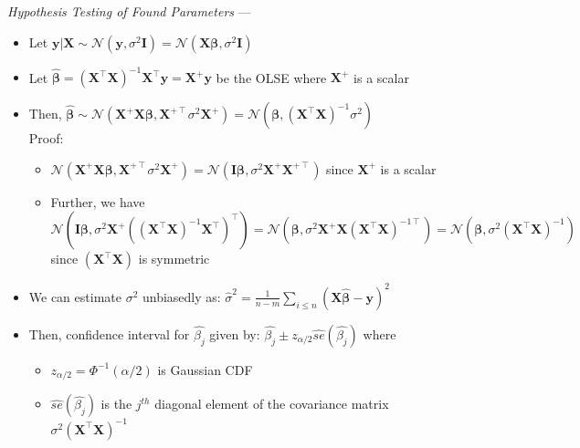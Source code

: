 \emph{Hypothesis Testing of Found Parameters} --- 
\begin{itemize}
    \item Let $\boldsymbol{y} | \boldsymbol{X} \sim \mathcal{N} (\boldsymbol{y}, \sigma^2 \boldsymbol{I}) = \mathcal{N} (\boldsymbol{X} \boldsymbol{\beta}, \sigma^2 \boldsymbol{I})$
    \item Let $\boldsymbol{\hat{\beta}} = (\boldsymbol{X}^\intercal \boldsymbol{X})^{-1}  \boldsymbol{X}^\intercal \boldsymbol{y} = \boldsymbol{X}^+ \boldsymbol{y}$ be the OLSE where $\boldsymbol{X}^+$ is a scalar
    \item Then, $\boldsymbol{\hat{\beta}} \sim \mathcal{N}( \boldsymbol{X}^+ \boldsymbol{X} \boldsymbol{\beta}, \boldsymbol{X}^{+ \intercal} \sigma^2 \boldsymbol{X}^+ ) = \mathcal{N}( \boldsymbol{\beta}, (\boldsymbol{X}^\intercal \boldsymbol{X})^{-1} \sigma^2 )$\\Proof:
    \begin{itemize}
        \item $\mathcal{N}( \boldsymbol{X}^+ \boldsymbol{X} \boldsymbol{\beta}, \boldsymbol{X}^{+ \intercal} \sigma^2 \boldsymbol{X}^+ ) = \mathcal{N}( \boldsymbol{I} \boldsymbol{\beta}, \sigma^2 \boldsymbol{X}^+ \boldsymbol{X}^{+ \intercal}  )$ since $\boldsymbol{X}^+$ is a scalar
        \item Further, we have $\mathcal{N}( \boldsymbol{I} \boldsymbol{\beta}, \sigma^2 \boldsymbol{X}^+ ((\boldsymbol{X}^\intercal \boldsymbol{X})^{-1}  \boldsymbol{X}^\intercal)^\intercal  ) = \mathcal{N}( \boldsymbol{\beta}, \sigma^2 \boldsymbol{X}^+ \boldsymbol{X} (\boldsymbol{X}^\intercal \boldsymbol{X})^{-1 \intercal}  ) = \mathcal{N}( \boldsymbol{\beta}, \sigma^2 (\boldsymbol{X}^\intercal \boldsymbol{X})^{-1}  )$ since $(\boldsymbol{X}^\intercal \boldsymbol{X})$ is symmetric
    \end{itemize}
    \item We can estimate $\sigma^2$ unbiasedly as: $\hat{\sigma}^2 = \frac{1}{n-m} \sum_{i \leq n} (\boldsymbol{X} \boldsymbol{\hat{\beta}} - \boldsymbol{y})^2$
    \item Then, confidence interval for $\hat{\beta_j}$ given by: $\hat{\beta_j} \pm z_{\alpha/2} \hat{se}(\hat{\beta_j})$ where 
    \begin{itemize}
        \item $z_{\alpha/2} = \Phi^{-1}(\alpha/2)$ is Gaussian CDF
        \item $\hat{se}(\hat{\beta_j})$ is the $j^{th}$ diagonal element of the covariance matrix $\sigma^2 (\boldsymbol{X}^\intercal \boldsymbol{X})^{-1}$

\end{itemize}
\end{itemize}
